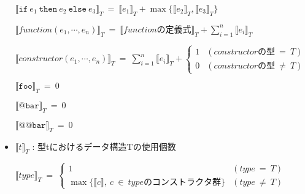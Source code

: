 \begin{figure}[p]
\begin{framed}
\begin{itemize}
  \begin{math}
    \llbracket \texttt{if} \ e_1 \ \texttt{then} \ e_2 \ \texttt{else} \ e_3 \rrbracket _T
    \ = \
    \llbracket e_1 \rrbracket _T + \max \{ \llbracket e_2 \rrbracket _T, \llbracket e_3 \rrbracket _T \}
  \end{math}
  \vspace{10pt}

  \begin{math}
    \llbracket function(e_1, \cdots, e_n) \rrbracket _T
    \ = \
    \llbracket functionの定義式 \rrbracket _T + \sum^n_{i=1} \llbracket e_i \rrbracket _T
  \end{math}
  \vspace{10pt}

  \begin{math}
    \llbracket constructor(e_1, \cdots, e_n) \rrbracket _T
    \ = \
    \sum^n_{i=1} \llbracket e_i \rrbracket _T +
    \begin{cases}
      1 & (constructorの型 \ = \ T) \\
      0 & (constructorの型 \ \neq \ T)
    \end{cases}
  \end{math}
  \vspace{10pt}

  \begin{math}
    \llbracket \texttt{foo} \rrbracket _T \ = \ 0
  \end{math}
  \vspace{10pt}

  \begin{math}
    \llbracket \texttt{@bar} \rrbracket _T \ = \ 0
  \end{math}
  \vspace{10pt}

  \begin{math}
    \llbracket \texttt{@@bar} \rrbracket _T \ = \ 0
  \end{math}

  \item $\llbracket t \rrbracket _T $ : 型tにおけるデータ構造Tの使用個数 \vspace{10pt}

  \begin{math}
    \llbracket
      type
    \rrbracket _T
    \ = \
    \begin{cases}
      1 & (type \ = \ T) \\
      \max \{ \llbracket c \rrbracket, \ c \ \in \ typeのコンストラクタ群 \} & (type \ \neq \ T)
    \end{cases}
  \end{math}
  \vspace{10pt}


\end{itemize}
\end{framed}
\end{figure}
